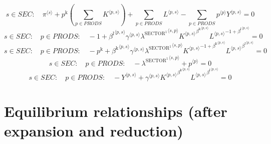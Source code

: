 \begin{equation}
s\in {S\!E\!C}\colon\quad {\pi}^{\langle s\rangle} + {p^{\mathrm{k}}} \left(\sum_{p\in {P\!R\!O\!D\!S}} {K}^{\langle p,s\rangle}\right) + \sum_{p\in {P\!R\!O\!D\!S}} {L}^{\langle p,s\rangle} - \sum_{p\in {P\!R\!O\!D\!S}} {{p}^{\langle p\rangle}} {{Y}^{\langle p,s\rangle}} = 0
\end{equation}
\begin{equation}
s\in {S\!E\!C}\colon\quad p\in {P\!R\!O\!D\!S}\colon\quad -1 + {{\beta^{\mathrm{l}}}^{\langle p,s\rangle}} {{\gamma}^{\langle p,s\rangle}} {{\lambda^{\mathrm{SECTOR}^{\mathrm{1}}}}^{\langle s,p\rangle}} {{{K}^{\langle p,s\rangle}}^{{\beta^{\mathrm{k}}}^{\langle p,s\rangle}}} {{{L}^{\langle p,s\rangle}}^{-1 + {\beta^{\mathrm{l}}}^{\langle p,s\rangle}}} = 0
\end{equation}
\begin{equation}
s\in {S\!E\!C}\colon\quad p\in {P\!R\!O\!D\!S}\colon\quad -p^{\mathrm{k}} + {{\beta^{\mathrm{k}}}^{\langle p,s\rangle}} {{\gamma}^{\langle p,s\rangle}} {{\lambda^{\mathrm{SECTOR}^{\mathrm{1}}}}^{\langle s,p\rangle}} {{{K}^{\langle p,s\rangle}}^{-1 + {\beta^{\mathrm{k}}}^{\langle p,s\rangle}}} {{{L}^{\langle p,s\rangle}}^{{\beta^{\mathrm{l}}}^{\langle p,s\rangle}}} = 0
\end{equation}
\begin{equation}
s\in {S\!E\!C}\colon\quad p\in {P\!R\!O\!D\!S}\colon\quad -{\lambda^{\mathrm{SECTOR}^{\mathrm{1}}}}^{\langle s,p\rangle} + {p}^{\langle p\rangle} = 0
\end{equation}
\begin{equation}
s\in {S\!E\!C}\colon\quad p\in {P\!R\!O\!D\!S}\colon\quad -{Y}^{\langle p,s\rangle} + {{\gamma}^{\langle p,s\rangle}} {{{K}^{\langle p,s\rangle}}^{{\beta^{\mathrm{k}}}^{\langle p,s\rangle}}} {{{L}^{\langle p,s\rangle}}^{{\beta^{\mathrm{l}}}^{\langle p,s\rangle}}} = 0
\end{equation}



\section{Equilibrium relationships (after expansion and reduction)}

